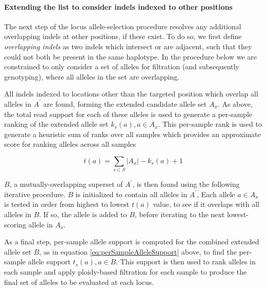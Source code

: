\documentclass{article}
\newcommand{\setSize}[1]{\ensuremath{\lvert{#1}\rvert}}
\begin{document}
\paragraph{Extending the list to consider indels indexed to other positions}

The next step of the locus allele-selection procedure resolves any additional overlapping indels at other positions, if these exist. To do so, we first define \emph{overlapping indels} as two indels which intersect or are adjacent, such that they could not both be present in the same haplotype. In the procedure below we are constrained to only consider a set of alleles for filtration (and subsequently genotyping), where all alleles in the set are overlapping.

All indels indexed to locations other than the targeted position which overlap all alleles in $A^{\prime}$ are found, forming the extended candidate allele set $A_x$. As above, the total read support for each of these alleles is used to generate a per-sample ranking of the extended allele set $k_s(a), a \in A_x$. This per-sample rank is used to generate a heuristic sum of ranks over all samples which provides an approximate score for ranking alleles across all samples

\begin{equation*}
t(a) = \sum_{s \in S}{\setSize{A_x} - k_s(a) + 1}
\end{equation*}

$B$, a mutually-overlapping superset of $A^{\prime}$, is then found using the following iterative procedure. $B$ is initialized to contain all alleles in $A^{\prime}$, Each allele $a \in A_x$ is tested in order from highest to lowest $t(a)$ value, to see if it overlaps with all alleles in $B$. If so, the allele is added to $B$, before iterating to the next lowest-scoring allele in $A_x$.

As a final step, per-sample allele support is computed for the combined extended allele set $B$, as in equation \ref{eq:perSampleAlleleSupport} above, to find the per-sample allele support $t_s(a), a \in B$. This support is then used to rank alleles in each sample and apply ploidy-based filtration for each sample to produce the final set of alleles to be evaluated at each locus.


\begin{comment}

Global allele Ranking

Following the ranking and selection of top alleles in individual samples, alleles are ranked over based on a sample-wide support score $t(a)$. This is found by a simple heuristic based on the sum of per-sample ranks computed above

\begin{equation*}
t(a) = \sum_{s \in S}{\max(0, p_s - k_s(a) + 1)}
\end{equation*}

\end{comment}
\end{document}
